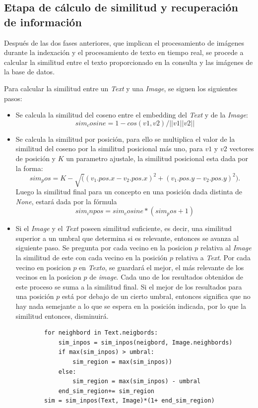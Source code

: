 \subsection*{Etapa de cálculo de similitud y recuperación de información}

Después de las dos fases anteriores, que implican el procesamiento de imágenes durante la indexación y el procesamiento de texto en tiempo real, se procede a calcular la similitud entre el texto proporcionado en la consulta y las imágenes de la base de datos.

Para calcular la similitud entre un \textit{Text} y una \textit{Image}, se siguen los siguientes pasos:
\begin{itemize}

    \item  Se calcula la similitud del coseno entre el embedding del \textit{Text} y de la \textit{Image}: 
    \[sim_cosine = 1- cos(v1,v2)/||v1||v2||\]

    \item  Se calcula la similitud por posici\'on, para ello se multiplica el valor de la similitud del coseno por la similitud posicional m\'as uno, para $v1$ y $v2$ vectores de posici\'on y $K$ un parametro ajustale, la similitud posicional esta dada por la forma: 
        \[sim_pos = K- \sqrt((v_1.pos.x - v_2.pos.x)^2+(v_1.pos.y - v_2.pos.y)^2).\]
    Luego la similitud final para un concepto en una posici\'on dada distinta de \textit{None}, estar\'a dada por la f\'ormula
            \[sim_inpos = sim_cosine *(sim_pos+1)\]
    
    \item Si el \textit{Image} y el \textit{Text} poseen similitud suficiente, es decir, una similitud superior a un umbral que determina si es relevante, entonces se avanza al siguiente paso. Se pregunta por cada vecino en la posicion $p$ relativa al \textit{Image} la similitud de este con cada vecino en la posición $p$ relativa a \textit{Text}. Por cada vecino en posicion $p$ en \textit{Texto}, se guardar\'a el mejor, el m\'as relevante de los vecinos en la posicion $p$ de \textit{image}. Cada uno de los resultados obtenidos de este proceso se suma a la similitud final. Si el mejor de los resultados para una posición $p$ está por debajo de un cierto umbral, entonces significa que no hay nada semejante a lo que se espera en la posición indicada, por lo que la similitud entonces, disminuirá.

    \begin{verbatim}
        for neighbord in Text.neigbords:
            sim_inpos = sim_inpos(neigbord, Image.neighbords)
            if max(sim_inpos) > umbral:
                sim_region = max(sim_inpos))
            else:
                sim_region = max(sim_inpos) - umbral
            end_sim_region+= sim_region
        sim = sim_inpos(Text, Image)*(1+ end_sim_region)
    \end{verbatim}
            

\end{itemize}
